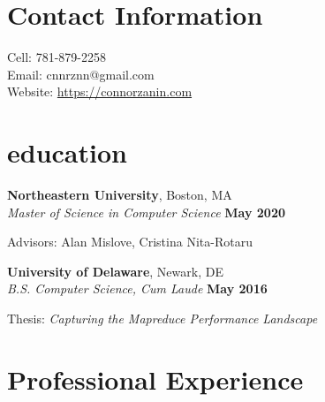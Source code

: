 \documentclass[margin,line]{resume}
\newif\ifReferences
\newif\ifOnline
\begin{document}
\Referencesfalse
\Onlinefalse


\begin{resume}


\section{\mysidestyle Contact Information}
\ifOnline
	Email: cnnrznn@gmail.com	 							\hfill Boston, MA\\
\else
   	\mbox{} \hfill Cell: 781-879-2258\\
   	\mbox{} \hfill Email: cnnrznn@gmail.com\\
    \mbox{} \hfill Website: \url{https://connorzanin.com}\\
\fi
   


\section{\mysidestyle education}
\textbf{Northeastern University}, Boston, MA \vspace{1mm}\\%
\textsl{Master of Science in Computer Science} \hfill \textbf{May 2020}
\vspace{-3mm}\\\vspace{-1mm}%
\begin{list2}
	\item Advisors: Alan Mislove, Cristina Nita-Rotaru
\end{list2}

\textbf{University of Delaware}, Newark, DE \vspace{1mm}\\%
\textsl{B.S. Computer Science, Cum Laude} \hfill \textbf{May 2016}\vspace{-3mm}\\\vspace{-1mm}%
\begin{list2}
    \item Thesis: \textsl{Capturing the Mapreduce Performance Landscape}
\end{list2}\vspace{-1.5mm}




\section{\mysidestyle Professional Experience}


\end{resume}
\end{document}
